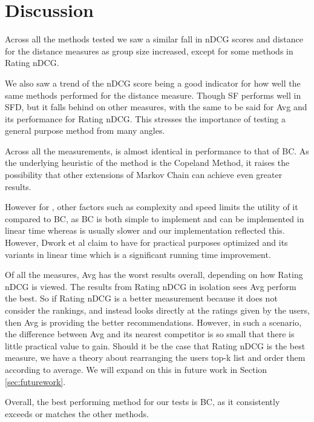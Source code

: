 \section{Discussion} \label{sec:discussion}

Across all the methods tested we saw a similar fall in nDCG scores and distance for the distance measures as group size increased, except for some methods in Rating nDCG.

We also saw a trend of the nDCG score being a good indicator for how well the same  methods performed for the distance measure. Though SF performs well in SFD, but it falls behind on other measures, with the same to be said for Avg and its performance for Rating nDCG. This stresses the importance of testing a general purpose method from many angles.

Across all the measurements, \MC is almost identical in performance to that of BC. As the underlying heuristic of the \MC method is the Copeland Method, it raises the possibility that other extensions of Markov Chain can achieve even greater results.

However for \MC, other factors such as complexity and speed limits the utility of it compared to BC, as BC is both simple to implement and can be implemented in linear time whereas \MC is usually slower and our implementation reflected this. However, Dwork et al claim to have for practical purposes optimized \MC and its variants in linear time which is a significant running time improvement\cite{rank:aggregation}.

Of all the measures, Avg has the worst results overall, depending on how Rating nDCG is viewed. The results from Rating nDCG in isolation sees Avg perform the best. So if Rating nDCG is a better measurement because it does not consider the rankings, and instead looks directly at the ratings given by the users, then Avg is providing the better recommendations. However, in such a scenario, the difference between Avg and its nearest competitor is so small that there is little practical value to gain. Should it be the case that Rating nDCG is the best measure, we have a theory about rearranging the users top-k list and order them according to average. We will expand on this in future work in Section \ref{sec:futurework}.

Overall, the best performing method for our tests is BC, as it consistently exceeds or matches the other methods.


